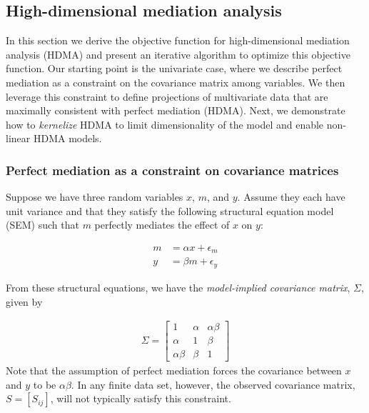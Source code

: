 \documentclass[
]{article}
\begin{document}
\subsection{High-dimensional mediation
analysis}\label{high-dimensional-mediation-analysis}

In this section we derive the objective function for high-dimensional
mediation analysis (HDMA) and present an iterative algorithm to optimize
this objective function. Our starting point is the univariate case,
where we describe perfect mediation as a constraint on the covariance
matrix among variables. We then leverage this constraint to define
projections of multivariate data that are maximally consistent with
perfect mediation (HDMA). Next, we demonstrate how to \textit{kernelize}
HDMA to limit dimensionality of the model and enable non-linear HDMA
models.

\subsubsection{Perfect mediation as a constraint on covariance
matrices}\label{perfect-mediation-as-a-constraint-on-covariance-matrices}

Suppose we have three random variables \(x\), \(m\), and \(y\). Assume
they each have unit variance and that they satisfy the following
structural equation model (SEM) such that \(m\) perfectly mediates the
effect of \(x\) on \(y\):

\begin{align}
m &= \alpha x + \epsilon_m \label{eqn:perfect_mediation1}\\ 
y &= \beta m + \epsilon_y  \label{eqn:perfect_mediation2}
\end{align}

From these structural equations, we have the
\textit{model-implied covariance matrix}, \(\Sigma\), given by

\begin{align}
\label{eqn:model_implied_covariance}
\Sigma = 
  \begin{bmatrix}
1 & \alpha & \alpha \beta \\
\alpha & 1 & \beta \\
\alpha \beta & \beta & 1
\end{bmatrix}
\end{align} Note that the assumption of perfect mediation forces the
covariance between \(x\) and \(y\) to be \(\alpha \beta\). In any finite
data set, however, the observed covariance matrix, \(S = [S_{ij}]\),
will not typically satisfy this constraint.
\end{document}
